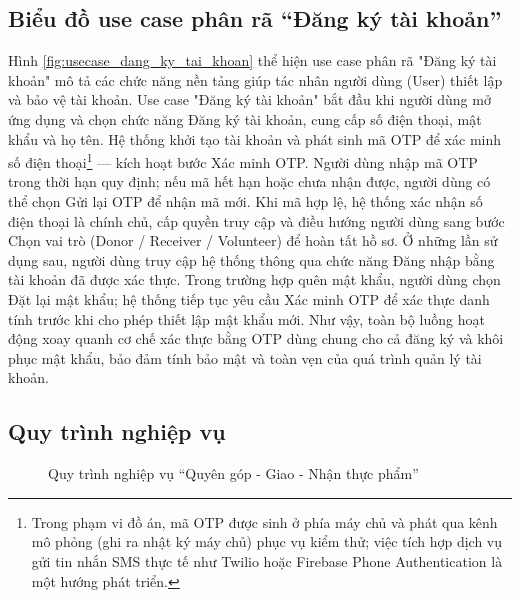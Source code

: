 \documentclass[../main.tex]{subfiles}%
\begin{document}
\subsection{Biểu đồ use case phân rã ``Đăng ký tài khoản''}
\label{section:2.3.5}

\noindent\begin{minipage}{\textwidth}
    \centering
    \label{fig:usecase_dang_ky_tai_khoan}
\end{minipage}
\vspace{-0.5\baselineskip}
\noindent

Hình \ref{fig:usecase_dang_ky_tai_khoan} thể hiện use case phân rã "Đăng ký tài khoản" mô tả các chức năng nền tảng giúp tác nhân người dùng (User) thiết lập và bảo vệ tài khoản. Use case "Đăng ký tài khoản" bắt đầu khi người dùng mở ứng dụng và chọn chức năng Đăng ký tài khoản, cung cấp số điện thoại, mật khẩu và họ tên. Hệ thống khởi tạo tài khoản và phát sinh mã OTP để xác minh số điện thoại\footnote{Trong phạm vi đồ án, mã OTP được sinh ở phía máy chủ và phát qua kênh mô phỏng (ghi ra nhật ký máy chủ) phục vụ kiểm thử; việc tích hợp dịch vụ gửi tin nhắn SMS thực tế như Twilio hoặc Firebase Phone Authentication là một hướng phát triển.} — kích hoạt bước Xác minh OTP. Người dùng nhập mã OTP trong thời hạn quy định; nếu mã hết hạn hoặc chưa nhận được, người dùng có thể chọn Gửi lại OTP để nhận mã mới. Khi mã hợp lệ, hệ thống xác nhận số điện thoại là chính chủ, cấp quyền truy cập và điều hướng người dùng sang bước Chọn vai trò (Donor / Receiver / Volunteer) để hoàn tất hồ sơ. Ở những lần sử dụng sau, người dùng truy cập hệ thống thông qua chức năng Đăng nhập bằng tài khoản đã được xác thực. Trong trường hợp quên mật khẩu, người dùng chọn Đặt lại mật khẩu; hệ thống tiếp tục yêu cầu Xác minh OTP để xác thực danh tính trước khi cho phép thiết lập mật khẩu mới. Như vậy, toàn bộ luồng hoạt động xoay quanh cơ chế xác thực bằng OTP dùng chung cho cả đăng ký và khôi phục mật khẩu, bảo đảm tính bảo mật và toàn vẹn của quá trình quản lý tài khoản.

\subsection{Quy trình nghiệp vụ}
\label{subsection:2.3.6}

\begin{figure}[H]
    \centering
    \caption{Quy trình nghiệp vụ ``Quyên góp - Giao - Nhận thực phẩm''}
    \label{fig:activity_quyen_gop_giao_nhan}
\end{figure}
\end{document}
